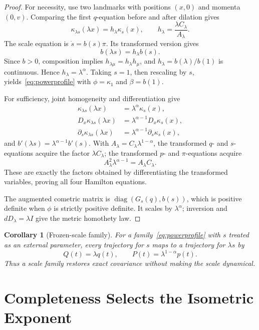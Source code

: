 \documentclass[11pt]{article}
\newtheorem{corollary}{Corollary}
\begin{document}
\begin{proof}
For necessity, use two landmarks with positions \((x,0)\) and momenta
\((0,v)\).  Comparing the first \(q\)-equation before and after dilation
gives
\[
 \kappa_{\lambda s}(\lambda x)=h_\lambda\kappa_s(x),
 \qquad h_\lambda=\frac{\lambda C_\lambda}{A_\lambda}.
\]
The scale equation is \(\dot s=b(s)\pi\).  Its transformed version gives
\[
 b(\lambda s)=h_\lambda b(s).
\]
Since \(b>0\), composition implies
\(h_{\lambda\mu}=h_\lambda h_\mu\), and
\(h_\lambda=b(\lambda)/b(1)\) is continuous.  Hence
\(h_\lambda=\lambda^\alpha\).  Taking \(s=1\), then rescaling by \(s\),
yields~\eqref{eq:powerprofile} with
\(\phi=\kappa_1\) and \(\beta=b(1)\).

For sufficiency, joint homogeneity and differentiation give
\[
\begin{aligned}
 \kappa_{\lambda s}(\lambda x)&=\lambda^\alpha\kappa_s(x),\\
 D_x\kappa_{\lambda s}(\lambda x)
 &=\lambda^{\alpha-1}D_x\kappa_s(x),\\
 \partial_s\kappa_{\lambda s}(\lambda x)
 &=\lambda^{\alpha-1}\partial_s\kappa_s(x),
\end{aligned}
\]
and \(b'(\lambda s)=\lambda^{\alpha-1}b'(s)\).
With \(A_\lambda=C_\lambda\lambda^{1-\alpha}\), the transformed
\(q\)- and \(s\)-equations acquire the factor \(\lambda C_\lambda\);
the transformed \(p\)- and \(\pi\)-equations acquire
\[
 A_\lambda^2\lambda^{\alpha-1}
 =A_\lambda C_\lambda.
\]
These are exactly the factors obtained by differentiating the transformed
variables, proving all four Hamilton equations.

The augmented cometric matrix is
\(\operatorname{diag}(G_s(q),b(s))\), which is positive definite when
\(\phi\) is strictly positive definite.  It scales by
\(\lambda^\alpha\); inversion and \(dD_\lambda=\lambda I\) give the
metric homothety law.
\end{proof}

\begin{corollary}[Frozen-scale family]
For a family~\eqref{eq:powerprofile} with \(s\) treated as an external
parameter, every trajectory for \(s\) maps to a trajectory for
\(\lambda s\) by
\[
 Q(t)=\lambda q(t),\qquad
 P(t)=\lambda^{1-\alpha}p(t).
\]
Thus a scale family restores exact covariance without making the scale
dynamical.
\end{corollary}

\section*{Completeness Selects the Isometric Exponent}
\end{document}
